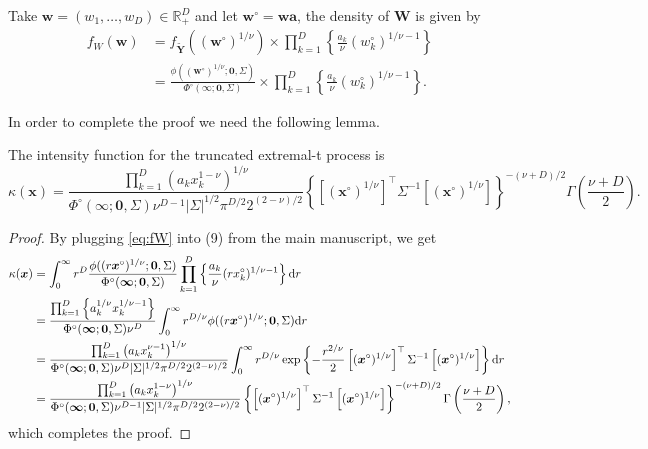\documentclass[12pt]{article}
\begin{document}
Take $\bm w = (w_1, \ldots, w_D) \in \mathbb{R}^D_+$ and let $\bm w^\circ = \bm w \bm a$, the density of $\bm W$ is given by
%
\begin{align}
\label{eq:fW}
f_W(\bm w) &= f_{\tilde{\bm Y}} \left( \left( \bm w^\circ \right)^{1/\nu} \right) \times \prod_{k=1}^D \left\{ \frac{a_k}{\nu} \left(w_k^\circ \right)^{1/\nu-1} \right\} \nonumber \\
&= \frac{\phi\left( \left( \bm w^\circ \right)^{1/\nu} ;\bm 0, \Sigma \right)} {\Phi^\circ(\bm \infty;\bm 0, \Sigma)} 
\times \prod_{k=1}^D \left\{ \frac{a_k}{\nu} \left(w_k^\circ\right)^{1/\nu-1} \right\}.
\end{align}
%

In order to complete the proof we need the following lemma.


\begin{lemma}
\label{lem:kappEt}
The intensity function for the truncated extremal-t process is
%
\begin{equation*}
\kappa(\bm x) = \frac{\prod_{k=1}^D \left(a_k x_k^{1-\nu}\right)^{1/\nu}}{\Phi^\circ(\bm \infty;\bm 0, \Sigma) \nu^{D-1}|\Sigma|^{1/2}\pi^{D/2}2^{(2-\nu)/2}} \left\{\left[(\bm x^\circ)^{1/\nu}\right]^\top \Sigma^{-1}\left[(\bm x^\circ)^{1/\nu}\right]\right\}^{-(\nu+D)/2} \Gamma\left(\frac{\nu+D}{2}\right).
\end{equation*}
\end{lemma}

\begin{proof}

By plugging \eqref{eq:fW} into (9) from the main manuscript, we get 
%
\begin{align*}
\kappa(\bm x) &= \int_0^\infty r^D \frac{\phi( (r \bm x^\circ)^{1/\nu};\bm 0, \Sigma)}{\Phi^\circ(\bm \infty;\bm 0, \Sigma)} \prod_{k=1}^D \left\{ \frac{a_k}{\nu} (r x_k^\circ)^{1/\nu-1}\right\}\text d r	\\
&= \frac{\prod_{k=1}^D \left\{a_k^{1/\nu} x_k^{1/\nu-1}\right\}}{\Phi^\circ(\bm \infty;\bm 0, \Sigma)\nu^D}\int_0^\infty r^{D/\nu} \phi( (r\bm x^\circ)^{1/\nu};\bm 0, \Sigma) \text d r\\
&= \frac{\prod_{k=1}^D \left(a_k x_k^{\nu-1}\right)^{1/\nu}}{\Phi^\circ(\bm \infty;\bm 0, \Sigma) \nu^D |\Sigma|^{1/2} \pi^{D/2}2^{(2-\nu)/2}} \int_0^\infty r^{D/\nu} \exp \left\{-\frac{r^{2/\nu}}{2} \left[(\bm x^\circ)^{1/\nu}\right]^\top\Sigma^{-1}\left[(\bm x^\circ)^{1/\nu}\right]\right\} \text dr\\
&= \frac{\prod_{k=1}^D \left(a_k x_k^{1-\nu}\right)^{1/\nu}}{\Phi^\circ(\bm \infty;\bm 0, \Sigma) \nu^{D-1}|\Sigma|^{1/2}\pi^{D/2}2^{(2-\nu)/2}} \left\{\left[(\bm x^\circ)^{1/\nu}\right]^\top \Sigma^{-1}\left[(\bm x^\circ)^{1/\nu}\right]\right\}^{-(\nu+D)/2} \Gamma\left(\frac{\nu+D}{2}\right),
\label{eq:truncated_extremal_t_intensity}
\end{align*}
%
which completes the proof.
%
\end{proof}
\end{document}
